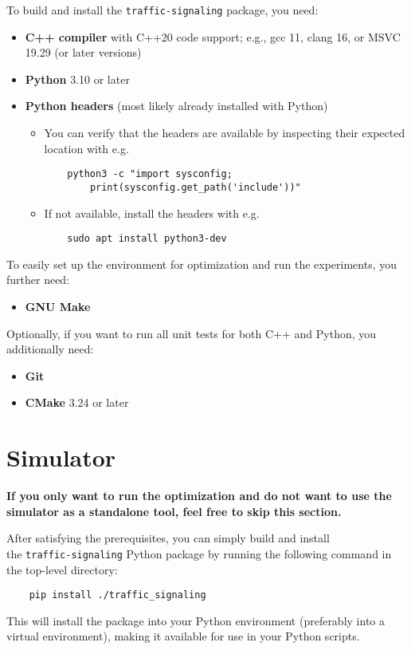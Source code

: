 To build and install the \verb|traffic-signaling| package, you need:
\begin{itemize}
    \item \textbf{C++ compiler} with C++20 code support; e.g., gcc 11, clang 16, or MSVC 19.29 (or later versions)
    \item \textbf{Python} 3.10 or later
    \item \textbf{Python headers} (most likely already installed with Python)
    \begin{itemize}
        \item You can verify that the headers are available by inspecting their expected location with e.g.
\begin{verbatim}
    python3 -c "import sysconfig;
        print(sysconfig.get_path('include'))"
\end{verbatim}
        \item If not available, install the headers with e.g.
\begin{verbatim}
    sudo apt install python3-dev
\end{verbatim}
    \end{itemize}
\end{itemize}
To easily set up the environment for optimization and run the experiments, you further need:
\begin{itemize}
    \item \textbf{GNU Make}
\end{itemize}
Optionally, if you want to run all unit tests for both C++ and Python, you additionally need:
\begin{itemize}
    \item \textbf{Git}
    \item \textbf{CMake} 3.24 or later
\end{itemize}

\newpage

\section{Simulator}

\textbf{If you only want to run the optimization and do not want to use the simulator as a standalone tool, feel free to skip this section.}

\bigskip

After satisfying the prerequisites, you can simply build and install \\
the \verb|traffic-signaling| Python package by running the following command in the top-level directory:
\begin{verbatim}
    pip install ./traffic_signaling
\end{verbatim}
This will install the package into your Python environment (preferably into a virtual environment), making it available for use in your Python scripts.

